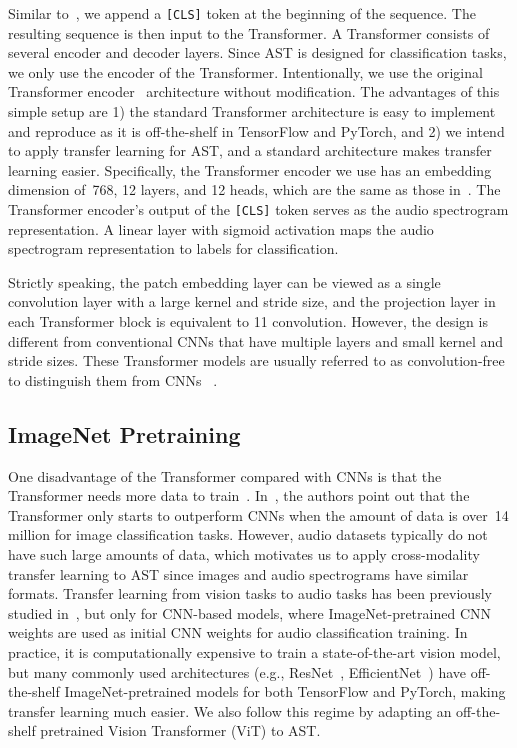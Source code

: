 \documentclass[a4paper]{article}
\begin{document}
Similar to~\cite{devlin2019bert}, we append a \texttt{[CLS]} token at the beginning of the sequence.
The resulting sequence is then input to the Transformer.
A Transformer consists of several encoder and decoder layers.
Since AST is designed for classification tasks, we only use the encoder of the Transformer.
Intentionally, we use the original Transformer encoder~\cite{vaswani2017attention} architecture without modification.
The advantages of this simple setup are 1) the standard Transformer architecture is easy to implement and reproduce as it is off-the-shelf in TensorFlow and PyTorch, and 2) we intend to apply transfer learning for AST, and a standard architecture makes transfer learning easier.
Specifically, the Transformer encoder we use has an embedding dimension of~768, 12 layers, and 12 heads, which are the same as those in~\cite{touvron2020deit,dosovitskiy2021image}.
The Transformer encoder's output of the \texttt{[CLS]} token serves as the audio spectrogram representation.
A linear layer with sigmoid activation maps the audio spectrogram representation to labels for classification. 

Strictly speaking, the patch embedding layer can be viewed as a single convolution layer with a large kernel and stride size, and the projection layer in each Transformer block is equivalent to 11 convolution. However, the design is different from conventional CNNs that have multiple layers and small kernel and stride sizes. These Transformer models are usually referred to as convolution-free to distinguish them from CNNs ~\cite{dosovitskiy2021image,touvron2020deit}.

\subsection{ImageNet Pretraining}
\label{sec:pretrain}

One disadvantage of the Transformer compared with CNNs is that the Transformer needs more data to train~\cite{dosovitskiy2021image}. In~\cite{dosovitskiy2021image}, the authors point out that the Transformer only starts to outperform CNNs when the amount of data is over~14 million for image classification tasks. However, audio datasets typically do not have such large amounts of data, which motivates us to apply cross-modality transfer learning to AST since images and audio spectrograms have similar formats. Transfer learning from vision tasks to audio tasks has been previously studied in~\cite{gwardys2014deep,guzhov2020esresnet,palanisamy2020rethinking,gong2021psla}, but only for CNN-based models, where ImageNet-pretrained CNN weights are used as initial CNN weights for audio classification training. In practice, it is computationally expensive to train a state-of-the-art vision model, but many commonly used architectures (e.g., ResNet~\cite{he2016deep}, EfficientNet~\cite{tan2019efficientnet}) have off-the-shelf ImageNet-pretrained models for both TensorFlow and PyTorch, making transfer learning much easier. We also follow this regime by adapting an off-the-shelf pretrained Vision Transformer (ViT) to AST. 
\end{document}
